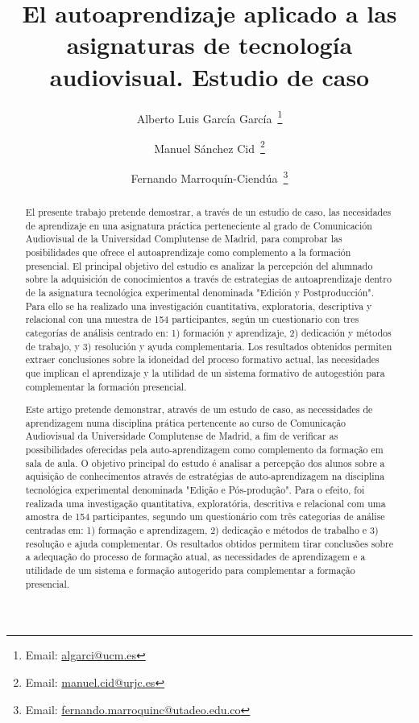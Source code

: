 \documentclass[spanish]{textolivre}
\title{El autoaprendizaje aplicado a las asignaturas de tecnología audiovisual. Estudio de caso}
\author[1]{Alberto Luis García García~\orcid{0000-0002-6805-6700}\thanks{Email: \href{mailto:algarci@ucm.es}{algarci@ucm.es}}}
\author[2]{Manuel Sánchez Cid~\orcid{0000-0002-7683-9000}\thanks{Email: \href{mailto:manuel.cid@urjc.es}{manuel.cid@urjc.es}}}
\author[3]{Fernando Marroquín-Ciendúa~\orcid{0000-0002-2213-4566}\thanks{Email: \href{mailto:fernando.marroquinc@utadeo.edu.co}{fernando.marroquinc@utadeo.edu.co}}}
\affil[1]{Universidad Complutense de Madrid, Madrid, España.}
\affil[2]{Universidad Rey Juan Carlos, Madrid, España.}
\affil[3]{Universidad de Bogotá Jorge Tadeo Lozano, Bogotá, Colombia.}
\begin{document}
\renewcommand{\tabularxcolumn}[1]{m{#1}}
\maketitle
\begin{polyabstract}
\begin{abstract}
El presente trabajo pretende demostrar, a través de un estudio de caso, las necesidades de aprendizaje en una asignatura práctica perteneciente al grado de Comunicación Audiovisual de la Universidad Complutense de Madrid, para comprobar las posibilidades que ofrece el autoaprendizaje como complemento a la formación presencial. El principal objetivo del estudio es analizar la percepción del alumnado sobre la adquisición de conocimientos a través de estrategias de autoaprendizaje dentro de la asignatura tecnológica experimental denominada "Edición y Postproducción". Para ello se ha realizado una investigación cuantitativa, exploratoria, descriptiva y relacional con una muestra de 154 participantes, según un cuestionario con tres categorías de análisis centrado en: 1) formación y aprendizaje, 2) dedicación y métodos de trabajo, y 3) resolución y ayuda complementaria. Los resultados obtenidos permiten extraer conclusiones sobre la idoneidad del proceso formativo actual, las necesidades que implican el aprendizaje y la utilidad de un sistema formativo de autogestión para complementar la formación presencial. 

\end{abstract}

\begin{portuguese}
\begin{abstract}
Este artigo pretende demonstrar, através de um estudo de caso, as necessidades de aprendizagem numa disciplina prática pertencente ao curso de Comunicação Audiovisual da Universidade Complutense de Madrid, a fim de verificar as possibilidades oferecidas pela auto-aprendizagem como complemento da formação em sala de aula. O objetivo principal do estudo é analisar a percepção dos alunos sobre a aquisição de conhecimentos através de estratégias de auto-aprendizagem na disciplina tecnológica experimental denominada "Edição e Pós-produção". Para o efeito, foi realizada uma investigação quantitativa, exploratória, descritiva e relacional com uma amostra de 154 participantes, segundo um questionário com três categorias de análise centradas em: 1) formação e aprendizagem, 2) dedicação e métodos de trabalho e 3) resolução e ajuda complementar. Os resultados obtidos permitem tirar conclusões sobre a adequação do processo de formação atual, as necessidades de aprendizagem e a utilidade de um sistema e formação autogerido para complementar a formação presencial. 


\end{abstract}
\end{portuguese}
\end{polyabstract}
\end{document}

